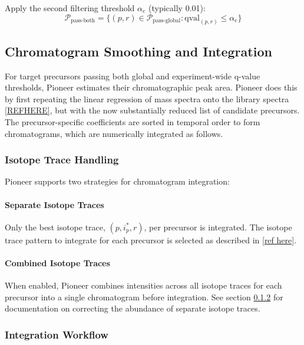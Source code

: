 \documentclass[pdflatex,sn-nature]{sn-jnl}
\begin{document}
Apply the second filtering threshold $\alpha_e$ (typically 0.01):
\begin{equation}
  \mathcal{P}_{\text{pass-both}} = \{(p,r) \in \mathcal{P}_{\text{pass-global}} : \text{qval}_{(p,r)} \leq \alpha_e\}
\end{equation}

\subsection{Chromatogram Smoothing and Integration}

For target precursors passing both global and experiment-wide q-value thresholds, Pioneer estimates their chromatographic peak area. Pioneer does this by first repeating the linear regression of mass spectra onto the library spectra \ref{REFHERE}, but with the now substantially reduced list of candidate precursors. The precursor-specific coefficients are sorted in temporal order to form chromatograms, which are numerically integrated as follows.

\subsubsection{Isotope Trace Handling}

Pioneer supports two strategies for chromatogram integration:

\paragraph{Separate Isotope Traces} Only the best isotope trace, $(p, i^*_p, r)$, per precursor is integrated. The isotope trace pattern to integrate for each precursor is selected as described in \ref{ref here}.

\paragraph{Combined Isotope Traces} When enabled, Pioneer combines intensities across all isotope traces for each precursor into a single chromatogram before integration. See section \ref{} for documentation on correcting the abundance of separate isotope traces.

\subsubsection{Integration Workflow}
\end{document}
